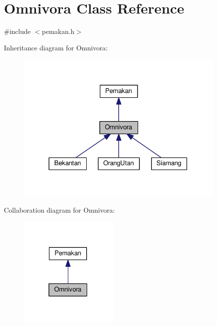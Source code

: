 \hypertarget{classOmnivora}{}\section{Omnivora Class Reference}
\label{classOmnivora}


{\ttfamily \#include $<$pemakan.\+h$>$}



Inheritance diagram for Omnivora\+:
\nopagebreak
\begin{figure}[H]
\begin{center}
\leavevmode
\includegraphics[width=294pt]{classOmnivora__inherit__graph}
\end{center}
\end{figure}


Collaboration diagram for Omnivora\+:
\nopagebreak
\begin{figure}[H]
\begin{center}
\leavevmode
\includegraphics[width=139pt]{classOmnivora__coll__graph}
\end{center}
\end{figure}
